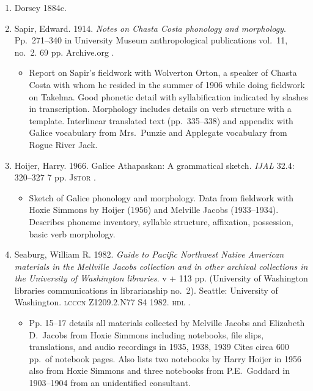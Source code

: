 \documentclass[12pt,letterpaper,oneside,article]{memoir}
\begin{document}
\begin{enumerate}
\item	Dorsey
	1884c.
\item	Sapir, Edward.
	1914.
	\textit{Notes on Chasta Costa phonology and morphology}.
	Pp.\ 271–340 in University Museum anthropological publications vol.\ 11, no.\ 2.
	69 pp.
	Archive.org .
	\begin{itemize}
	\item	Report on Sapir’s fieldwork with Wolverton Orton, a speaker of Chasta Costa
		with whom he resided in the summer of 1906 while doing fieldwork on Takelma.
		Good phonetic detail with syllabification indicated by slashes in transcription.
		Morphology includes details on verb structure with a template.
		Interlinear translated text (pp.\ 335–338) and appendix with Galice vocabulary
		from Mrs.\ Punzie and Applegate vocabulary from Rogue River Jack.
	\end{itemize}
\item	Hoijer, Harry.
	1966.
	Galice Athapaskan: A grammatical sketch.
	\textit{IJAL} 32.4: 320–327
	7 pp.
	\textsc{Jstor} .
	\begin{itemize}
	\item	Sketch of Galice phonology and morphology.
		Data from fieldwork with Hoxie Simmons by Hoijer (1956) and Melville Jacobs
		(1933–1934).
		Describes phoneme inventory, syllable structure, affixation, possession,
		basic verb morphology.
	\end{itemize}
\item	Seaburg, William R.
	1982.
	\textit{Guide to Pacific Northwest Native American materials in the Mellville Jacobs
		collection and in other archival collections in the University of Washington
		libraries}.
	v + 113 pp.
	(University of Washington libraries communications in librarianship no.\ 2).
	Seattle: University of Washington.
	\textsc{lcccn} Z1209.2.N77 S4 1982.
	\textsc{hdl} .
	\begin{itemize}
	\item	Pp. 15–17 details all materials collected by Melville Jacobs and Elizabeth
		D.\ Jacobs from Hoxie Simmons including notebooks, file slips, translations,
		and audio recordings in 1935, 1938, 1939
		Cites circa 600 pp.\ of notebook pages.
		Also lists two notebooks by Harry Hoijer in 1956 also from Hoxie Simmons and
		three notebooks from P.E.\ Goddard in 1903–1904 from an unidentified consultant.
	\end{itemize}
\end{enumerate}
\end{document}
